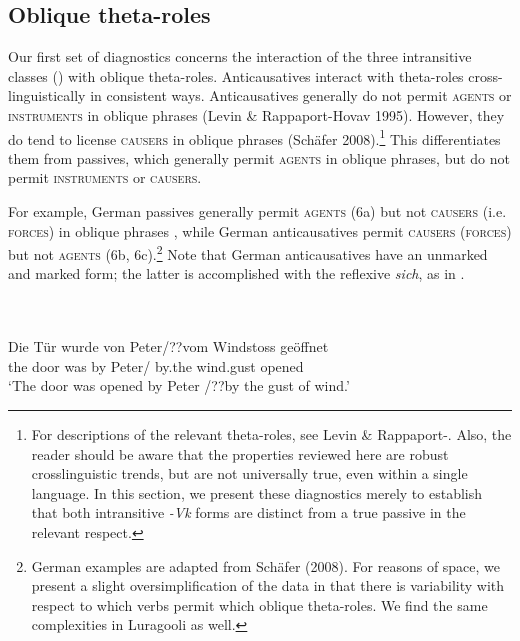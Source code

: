 \documentclass[output=paper]{langsci/langscibook}
\begin{document}
\subsection{Oblique theta-roles} %

Our first set of diagnostics concerns the interaction of the three intransitive classes () with oblique theta-roles. Anticausatives interact with theta-roles cross-linguistically in consistent ways. Anticausatives generally do not permit \textsc{agents }or \textsc{instruments }in oblique phrases (Levin \& Rappaport-Hovav 1995). However, they do tend to license \textsc{causers} in oblique phrases (Schäfer 2008).\footnote{ For descriptions of the relevant theta-roles, see Levin \& Rappaport-\citet{Hovav1995}. Also, the reader should be aware that the properties reviewed here are robust crosslinguistic trends, but are not universally true, even within a single language. In this section, we present these diagnostics merely to establish that both intransitive \textit{-Vk} forms are distinct from a true passive in the relevant respect.} This differentiates them from passives, which generally permit \textsc{agents} in oblique phrases, but do not permit \textsc{instruments }or \textsc{causers}.

For example, German passives generally permit \textsc{agents (6}a) but not \textsc{causers (}i.e. \textsc{forces}) in oblique phrases\textsc{ }, while German anticausatives permit \textsc{causers} (\textsc{forces}) but not \textsc{agents }(6b, 6c).\footnote{{ }German examples are adapted from Schäfer (2008). For reasons of space, we present a slight oversimplification of the data in that there is variability with respect to which verbs permit which oblique theta-roles. We find the same complexities in Luragooli as well.}\textsuperscript{  }Note that German anticausatives have an unmarked and marked form; the latter is accomplished with the reflexive \textit{sich}, as in .

\ea\label{exx:}
{}\\
\ea\label{ex:}
\\
\gll   Die Tür wurde von Peter/??vom      Windstoss  geöffnet\\
       the door was    by   Peter/     by.the  wind.gust   opened\\
\glt ‘The door was opened by Peter /??by the gust of wind.’
\end{document}
